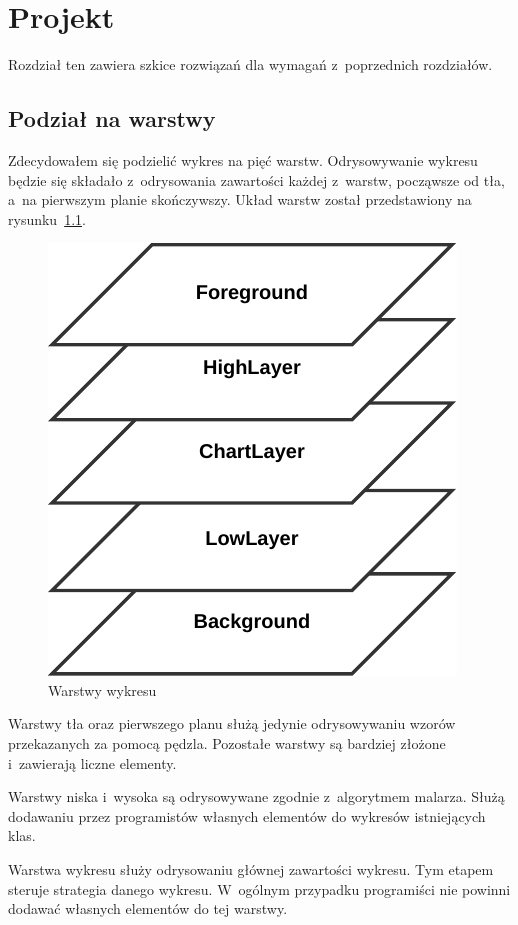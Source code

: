 \chapter{Projekt}
Rozdział ten zawiera szkice rozwiązań dla wymagań z~poprzednich rozdziałów.

\section{Podział na warstwy}
Zdecydowałem się podzielić wykres na pięć warstw. Odrysowywanie wykresu będzie się składało z~odrysowania zawartości każdej z~warstw, począwsze od tła, a~na pierwszym planie skończywszy.
Układ warstw został przedstawiony na rysunku~\ref{rys:warstwy}.

\begin{figure}
\centering
\caption{Warstwy wykresu}\label{rys:warstwy}
\includegraphics{img/warstwy.pdf}
\end{figure}

Warstwy tła oraz pierwszego planu służą jedynie odrysowywaniu wzorów przekazanych za pomocą pędzla. Pozostałe warstwy są bardziej złożone i~zawierają liczne elementy.

Warstwy niska i~wysoka są odrysowywane zgodnie z~algorytmem malarza. Służą dodawaniu przez programistów własnych elementów do wykresów istniejących klas.

Warstwa wykresu służy odrysowaniu głównej zawartości wykresu. Tym etapem steruje strategia danego wykresu. W~ogólnym przypadku programiści nie powinni dodawać własnych elementów do tej warstwy.

